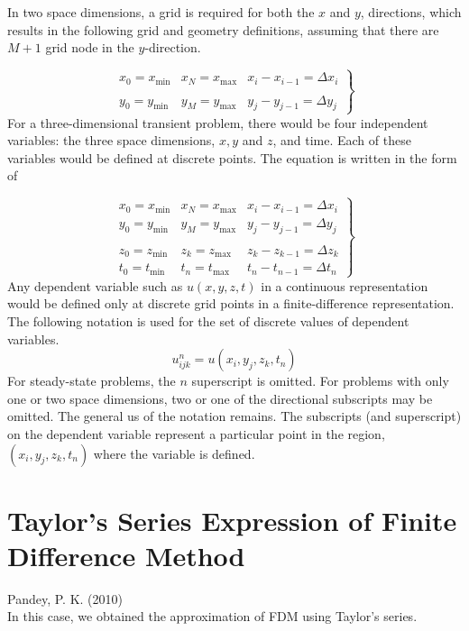 \documentclass[12pt]{report}
\newcommand{\sps}{\\[0.2cm]}
\newcommand{\NI}{\noindent}
\begin{document}
	\NI In two space dimensions, a grid is required for both the $x$ and $y$, directions, which results in the following grid and geometry definitions, assuming that there are $M+1$ grid node in the $y$-direction.
	
	\begin{equation}
		\left.
			\begin{array}{lll}
				x_0 = x_{\text{min}} & x_N = x_{\text{max}} & x_i-x_{i-1}=\Delta x_i\\
				\\
				y_0 = y_{\text{min}} & y_M = y_{\text{max}} & y_j-y_{j-1}=\Delta y_j
			\end{array}
		\right\}
		\label{eq:3_10}
	\end{equation}
	For a three-dimensional transient problem, there would be four independent variables: the three space dimensions, $x, y$ and $z$, and time. Each of these variables would be defined at discrete points. The equation is written in the form of 
	
	\begin{equation}
		\left.
		\begin{array}{lll}
			x_0 = x_{\text{min}} & x_N = x_{\text{max}} & x_i-x_{i-1}=\Delta x_i\\
			y_0 = y_{\text{min}} & y_M = y_{\text{max}} & y_j-y_{j-1}=\Delta y_j\\
			\\
			z_0 = z_{\text{min}} & z_k = z_{\text{max}} & z_k-z_{k-1}=\Delta z_k\\
			t_0 = t_{\text{min}} & t_n = t_{\text{max}} & t_n-t_{n-1}=\Delta t_n
		\end{array}
		\right\}
		\label{eq:3_11}
	\end{equation}
	Any dependent variable such as $u(x,y,z,t)$ in a continuous representation would be defined only at discrete grid points in a finite-difference representation. The following notation is used for the set of discrete values of dependent variables.
	\begin{equation*}
		u_{ijk}^n = u(x_i,y_j,z_k,t_n)
	\end{equation*}
	For steady-state problems, the $n$ superscript is omitted. For problems with only one or two space dimensions, two or one of the directional subscripts may be omitted. The general us of the notation remains. The subscripts (and superscript) on the dependent variable represent a particular point in the region, $(x_i,y_j,z_k,t_n)$ where the variable is defined. 
	
	\section{Taylor's Series Expression of Finite Difference Method}
	Pandey, P. K. (2010)\\
	In this case, we obtained the approximation of FDM using Taylor's series.\sps
	
\end{document}
